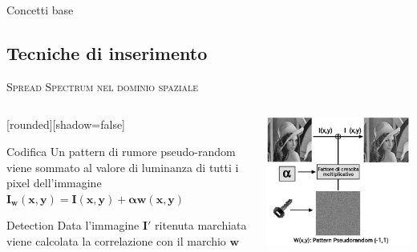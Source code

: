\documentclass{beamer}
\begin{document}
\begin{section}{Concetti base}
\subsection{Tecniche di inserimento}
\begin{frame}[t]{\textsc{Spread Spectrum nel dominio spaziale}}
\begin{columns}
\begin{column}{5cm}
	[rounded][shadow=false]
\begin{block}{Codifica}
\centering Un pattern di rumore pseudo-random viene sommato al valore di luminanza di tutti i pixel dell'immagine
$ \mathbf{I_{w}(x,y) = I(x,y) + \alpha w(x,y)}$
\end{block}
\begin{block}{Detection}
Data l'immagine $\mathbf{I'}$ ritenuta marchiata viene calcolata la correlazione con il marchio $\mathbf{w}$
\end{block}
\end{column}
\begin{column}{5cm}
\vspace{1.5em}
\centering
\includegraphics[width=1\linewidth]{./img/ss.png}
\end{column}
\end{columns}
\end{frame}



\end{section}
\end{document}
